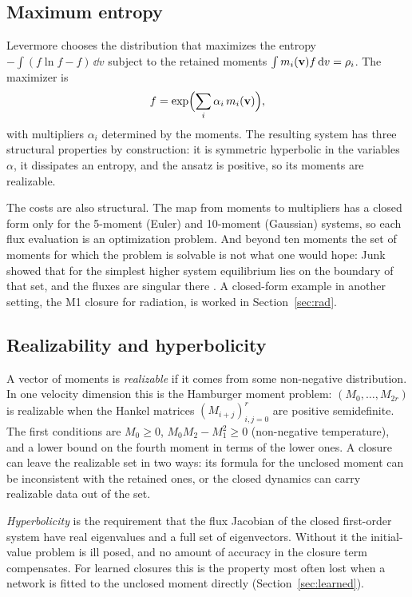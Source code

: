 \subsection{Maximum entropy}

Levermore \cite{Levermore96} chooses the distribution that maximizes the
entropy $-\int(f\ln f-f)\,\dd v$ subject to the retained moments
$\int m_i(\mathbf{v})f\,\mathrm{d} v=\rho_i$. The maximizer is
\begin{equation}
  f=\exp\Bigl(\sum_i\alpha_i\,m_i(\mathbf{v})\Bigr),
\end{equation}
with multipliers $\alpha_i$ determined by the moments. The resulting system
has three structural properties by construction: it is symmetric hyperbolic
in the variables $\alpha$, it dissipates an entropy, and the ansatz is
positive, so its moments are realizable.

The costs are also structural. The map from moments to multipliers has a
closed form only for the 5-moment (Euler) and 10-moment (Gaussian) systems,
so each flux evaluation is an optimization problem. And beyond ten moments
the set of moments for which the problem is solvable is not what one would
hope: Junk showed that for the simplest higher system equilibrium lies on
the boundary of that set, and the fluxes are singular there \cite{Junk98}.
A closed-form example in another setting, the M1 closure for radiation, is
worked in Section~\ref{sec:rad}.

\subsection{Realizability and hyperbolicity}
\label{sec:realizability}

A vector of moments is \emph{realizable} if it comes from some non-negative
distribution. In one velocity dimension this is the Hamburger moment
problem: $(M_0,\dots,M_{2r})$ is realizable when the Hankel matrices
$(M_{i+j})_{i,j=0}^{r}$ are positive semidefinite. The first conditions are
$M_0\ge0$, $M_0M_2-M_1^2\ge0$ (non-negative temperature), and a lower bound
on the fourth moment in terms of the lower ones. A closure can leave the
realizable set in two ways: its formula for the unclosed moment can be
inconsistent with the retained ones, or the closed dynamics can carry
realizable data out of the set.

\emph{Hyperbolicity} is the requirement that the flux Jacobian of the
closed first-order system have real eigenvalues and a full set of
eigenvectors. Without it the initial-value problem is ill posed, and no
amount of accuracy in the closure term compensates. For learned closures
this is the property most often lost when a network is fitted to the
unclosed moment directly (Section~\ref{sec:learned}).

